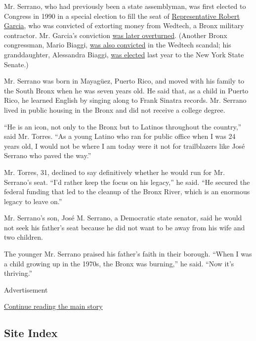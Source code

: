 Mr. Serrano, who had previously been a state assemblyman, was first
elected to Congress in 1990 in a special election to fill the seat of
\href{https://www.nytimes3xbfgragh.onion/2017/01/26/nyregion/robert-garcia-dead-bronx-congressman.html}{Representative
Robert Garcia}, who was convicted of extorting money from Wedtech, a
Bronx military contractor. Mr. Garcia's conviction
\href{https://www.nytimes3xbfgragh.onion/1990/06/30/nyregion/garcias-extortion-convictions-are-reversed-by-appeals-panel.html?module=inline}{was
later overturned}. (Another Bronx congressman, Mario Biaggi,
\href{https://www.nytimes3xbfgragh.onion/2015/06/26/nyregion/mario-biaggi-10-term-new-york-congressman-who-went-to-prison-dies-at-97.html}{was
also convicted} in the Wedtech scandal; his granddaughter, Alessandra
Biaggi,
\href{https://www.nytimes3xbfgragh.onion/2018/09/13/nyregion/state-senate-election-results-idc-klein.html}{was
elected} last year to the New York State Senate.)

Mr. Serrano was born in Mayagüez, Puerto Rico, and moved with his family
to the South Bronx when he was seven years old. He said that, as a child
in Puerto Rico, he learned English by singing along to Frank Sinatra
records. Mr. Serrano lived in public housing in the Bronx and did not
receive a college degree.

``He is an icon, not only to the Bronx but to Latinos throughout the
country,'' said Mr. Torres. ``As a young Latino who ran for public
office when I was 24 years old, I would not be where I am today were it
not for trailblazers like José Serrano who paved the way.''

Mr. Torres, 31, declined to say definitively whether he would run for
Mr. Serrano's seat. ``I'd rather keep the focus on his legacy,'' he
said. ``He secured the federal funding that led to the cleanup of the
Bronx River, which is an enormous legacy to leave on.''

Mr. Serrano's son, José M. Serrano, a Democratic state senator, said he
would not seek his father's seat because he did not want to be away from
his wife and two children.

The younger Mr. Serrano praised his father's faith in their borough.
``When I was a child growing up in the 1970s, the Bronx was burning,''
he said. ``Now it's thriving.''

Advertisement

\protect\hyperlink{after-bottom}{Continue reading the main story}

\hypertarget{site-index}{%
\subsection{Site Index}\label{site-index}}

